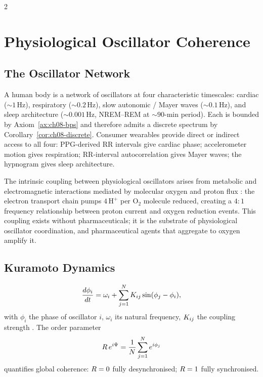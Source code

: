\begin{multicols}{2}

\section{Physiological Oscillator Coherence}
\label{sec:ch08-coherence}

\subsection{The Oscillator Network}

A human body is a network of oscillators at four characteristic timescales: cardiac ($\sim 1$\,Hz), respiratory ($\sim 0.2$\,Hz), slow autonomic / Mayer waves ($\sim 0.1$\,Hz), and sleep architecture ($\sim 0.001$\,Hz, NREM--REM at $\sim 90$-min period). Each is bounded by Axiom~\ref{ax:ch08-bps} and therefore admits a discrete spectrum by Corollary~\ref{cor:ch08-discrete}. Consumer wearables provide direct or indirect access to all four: PPG-derived RR intervals give cardiac phase; accelerometer motion gives respiration; RR-interval autocorrelation gives Mayer waves; the hypnogram gives sleep architecture.

The intrinsic coupling between physiological oscillators arises from metabolic and electromagnetic interactions mediated by molecular oxygen and proton flux \citep{wallace2013, halestrap2013}: the electron transport chain pumps $4\,\mathrm{H}^+$ per O$_2$ molecule reduced, creating a $4{:}1$ frequency relationship between proton current and oxygen reduction events. This coupling exists without pharmaceuticals; it is the substrate of physiological oscillator coordination, and pharmaceutical agents that aggregate to oxygen amplify it.

\subsection{Kuramoto Dynamics}

\begin{equation}
\frac{d\phi_i}{dt} = \omega_i + \sum_{j=1}^{N} K_{ij}\sin(\phi_j - \phi_i),
\label{eq:ch08-kuramoto}
\end{equation}
with $\phi_i$ the phase of oscillator $i$, $\omega_i$ its natural frequency, $K_{ij}$ the coupling strength \citep{kuramoto1984, strogatz2000, acebron2005}. The order parameter
\begin{equation}
R\,e^{i\Psi} = \frac{1}{N}\sum_{j=1}^{N} e^{i\phi_j}
\label{eq:ch08-R}
\end{equation}
quantifies global coherence: $R = 0$ fully desynchronised; $R = 1$ fully synchronised.


\end{multicols}
